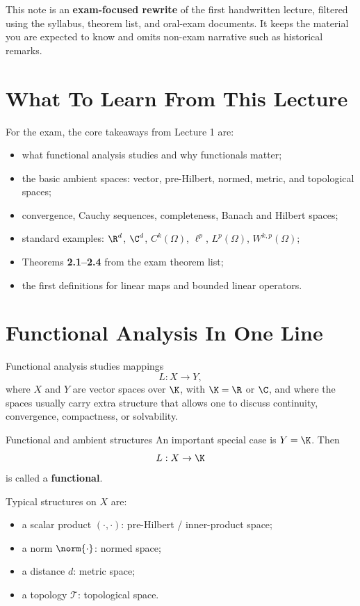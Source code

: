 \documentclass[11pt]{article}
\newcommand{\Lp}{L^p}
\begin{document}

\vspace{0.8em}

\begin{focusbox}
This note is an \textbf{exam-focused rewrite} of the first handwritten lecture, filtered using the syllabus, theorem list, and oral-exam documents. It keeps the material you are expected to know and omits non-exam narrative such as historical remarks.
\end{focusbox}

\tableofcontents

\section{What To Learn From This Lecture}

\begin{focusbox}
For the exam, the core takeaways from Lecture 1 are:
\begin{itemize}
\item what functional analysis studies and why functionals matter;
\item the basic ambient spaces: vector, pre-Hilbert, normed, metric, and topological spaces;
\item convergence, Cauchy sequences, completeness, Banach and Hilbert spaces;
\item standard examples: $\R^d$, $\C^d$, $C^k(\Omega)$, $\ell^p$, $\Lp(\Omega)$, $W^{k,p}(\Omega)$;
\item Theorems \textbf{2.1--2.4} from the exam theorem list;
\item the first definitions for linear maps and bounded linear operators.
\end{itemize}
\end{focusbox}

\section{Functional Analysis In One Line}

Functional analysis studies mappings
\[
L:X\to Y,
\]
where $X$ and $Y$ are vector spaces over $\K$, with $\K=\R$ or $\C$, and where the spaces usually carry extra structure that allows one to discuss continuity, convergence, compactness, or solvability.

\begin{defbox}{Functional and ambient structures}
An important special case is $Y=\K$. Then
\[
L:X\to \K
\]
is called a \textbf{functional}.

Typical structures on $X$ are:
\begin{itemize}
\item a scalar product $(\cdot,\cdot)$: pre-Hilbert / inner-product space;
\item a norm $\norm{\cdot}$: normed space;
\item a distance $d$: metric space;
\item a topology $\mathcal T$: topological space.
\end{itemize}
\end{defbox}
\end{document}

